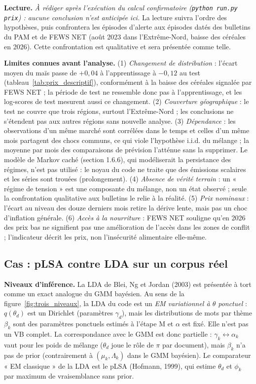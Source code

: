 \textbf{Lecture. }\emph{À rédiger après l'exécution du calcul confirmatoire (\texttt{python run.py prix}) : aucune conclusion n'est anticipée ici.} La lecture suivra l'ordre des hypothèses, puis confrontera les épisodes d'alerte aux épisodes datés des bulletins du PAM et de FEWS NET (août 2023 dans l'Extrême-Nord, baisse des céréales en 2026). Cette confrontation est qualitative et sera présentée comme telle.

\textbf{Limites connues avant l'analyse. }(1) \emph{Changement de distribution} : l'écart moyen du maïs passe de $+0{,}04$ à l'apprentissage à $-0{,}12$ au test (tableau~\ref{tab:prix_descriptif}), conformément à la baisse des céréales signalée par FEWS NET ; la période de test ne ressemble donc pas à l'apprentissage, et les log-scores de test mesurent aussi ce changement. (2) \emph{Couverture géographique} : le test ne couvre que trois régions, surtout l'Extrême-Nord ; les conclusions ne s'étendent pas aux autres régions sans nouvelle analyse. (3) \emph{Dépendance} : les observations d'un même marché sont corrélées dans le temps et celles d'un même mois partagent des chocs communs, ce qui viole l'hypothèse i.i.d. du mélange ; la moyenne par mois des comparaisons de prévision l'atténue sans la supprimer. Le modèle de Markov caché (section 1.6.6), qui modéliserait la persistance des régimes, n'est pas utilisé : le noyau du code ne traite que des émissions scalaires et les séries sont trouées (prolongement). (4) \emph{Absence de vérité terrain} : un « régime de tension » est une composante du mélange, non un état observé ; seule la confrontation qualitative aux bulletins le relie à la réalité. (5) \emph{Prix nominaux} : l'écart au niveau des douze derniers mois retire la dérive lente, mais pas un choc d'inflation générale. (6) \emph{Accès à la nourriture} : FEWS NET souligne qu'en 2026 des prix bas ne signifient pas une amélioration de l'accès dans les zones de conflit ; l'indicateur décrit les prix, non l'insécurité alimentaire elle-même.


\subsection{Cas : pLSA contre LDA sur un corpus réel}
\textbf{Niveaux d'inférence. }La LDA de Blei, Ng et Jordan (2003) est présentée à tort comme un exact analogue du GMM bayésien. Au sens de la figure~\ref{fig:trois_niveaux}, la LDA du code est un \emph{EM variationnel à $\theta$ ponctuel} : $q(\theta_d)$ est un Dirichlet (paramètres $\gamma_d$), mais les distributions de mots par thème $\beta_k$ sont des paramètres ponctuels estimés à l'étape M et $\alpha$ est fixé. Elle n'est pas un VB complet. La correspondance avec le GMM est donc partielle : $\gamma_k \leftrightarrow \alpha_k$ vaut pour les poids de mélange ($\theta_d$ joue le rôle de $\pi$ par document), mais $\beta_k$ n'a pas de prior (contrairement à $(\mu_k,\Lambda_k)$ dans le GMM bayésien). Le comparateur « EM classique » de la LDA est le pLSA (Hofmann, 1999), qui estime $\theta_d$ et $\phi_k$ par maximum de vraisemblance sans prior.

